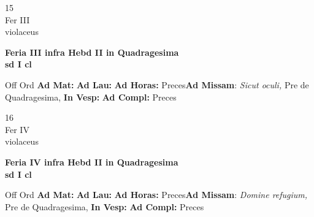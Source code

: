 \documentclass[10pt, openany]{book}
\begin{document}
        \begin{center}
            \begin{minipage}{3.5in}
                \vspace{2em}
                \begin{minipage}{0.5in}
                    {\Huge 15} \\
                    {\normalsize Fer III} \\
                    {\normalsize violaceus}
                \end{minipage}
                \begin{minipage}{3.0in}
                    \textbf{ \large Feria III infra Hebd II in Quadragesima \\
                    \textnormal{\normalsize sd I cl}} \\ 
                \end{minipage}
                \begin{justify}Off Ord
                    \textbf{Ad Mat: }
                    \textbf{Ad Lau: }
                    \textbf{Ad Horas: }Preces\textbf{Ad Missam}: \textit{Sicut oculi,} Pre de Quadragesima,  
                    \textbf{In Vesp: }
                    \textbf{Ad Compl: }Preces
                \end{justify}
            \end{minipage}
        \end{center}
    
        \begin{center}
            \begin{minipage}{3.5in}
                \vspace{2em}
                \begin{minipage}{0.5in}
                    {\Huge 16} \\
                    {\normalsize Fer IV} \\
                    {\normalsize violaceus}
                \end{minipage}
                \begin{minipage}{3.0in}
                    \textbf{ \large Feria IV infra Hebd II in Quadragesima \\
                    \textnormal{\normalsize sd I cl}} \\ 
                \end{minipage}
                \begin{justify}Off Ord
                    \textbf{Ad Mat: }
                    \textbf{Ad Lau: }
                    \textbf{Ad Horas: }Preces\textbf{Ad Missam}: \textit{Domine refugium,} Pre de Quadragesima,  
                    \textbf{In Vesp: }
                    \textbf{Ad Compl: }Preces
                \end{justify}
            \end{minipage}
        \end{center}
    
\end{document}
